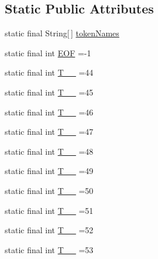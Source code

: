 \subsection*{Static Public Attributes}
\begin{DoxyCompactItemize}
\item 
static final String\mbox{[}$\,$\mbox{]} \hyperlink{classorg_1_1tzi_1_1use_1_1parser_1_1testsuite_1_1_test_suite_parser_ab3d9173889a1ea426141b291af2227ce}{token\-Names}
\item 
static final int \hyperlink{classorg_1_1tzi_1_1use_1_1parser_1_1testsuite_1_1_test_suite_parser_a0ebcee9b6b22f1c9c8759e4a3c16f836}{E\-O\-F} =-\/1
\item 
static final int \hyperlink{classorg_1_1tzi_1_1use_1_1parser_1_1testsuite_1_1_test_suite_parser_a46f9c9c87de4c840f5c45f4f92a27a65}{T\-\_\-\-\_} =44
\item 
static final int \hyperlink{classorg_1_1tzi_1_1use_1_1parser_1_1testsuite_1_1_test_suite_parser_adafd571624b826beb2972b999d5de3e8}{T\-\_\-\-\_} =45
\item 
static final int \hyperlink{classorg_1_1tzi_1_1use_1_1parser_1_1testsuite_1_1_test_suite_parser_a6fb7f06426ecf2205e40e842a1a3cb08}{T\-\_\-\-\_} =46
\item 
static final int \hyperlink{classorg_1_1tzi_1_1use_1_1parser_1_1testsuite_1_1_test_suite_parser_ab83b77dcf05eb35842d0f34f1055af47}{T\-\_\-\-\_} =47
\item 
static final int \hyperlink{classorg_1_1tzi_1_1use_1_1parser_1_1testsuite_1_1_test_suite_parser_aed5433e3db2e62ad12a7c6c7d41721ed}{T\-\_\-\-\_} =48
\item 
static final int \hyperlink{classorg_1_1tzi_1_1use_1_1parser_1_1testsuite_1_1_test_suite_parser_a3cbaeef0361cb06718af841dd29f04f0}{T\-\_\-\-\_} =49
\item 
static final int \hyperlink{classorg_1_1tzi_1_1use_1_1parser_1_1testsuite_1_1_test_suite_parser_a250da1c915306606296293c6b398f37e}{T\-\_\-\-\_} =50
\item 
static final int \hyperlink{classorg_1_1tzi_1_1use_1_1parser_1_1testsuite_1_1_test_suite_parser_a689feacf30dab824b630c86863883729}{T\-\_\-\-\_} =51
\item 
static final int \hyperlink{classorg_1_1tzi_1_1use_1_1parser_1_1testsuite_1_1_test_suite_parser_a51a03aa07c202e0de9cfb4d183e3126a}{T\-\_\-\-\_} =52
\item 
static final int \hyperlink{classorg_1_1tzi_1_1use_1_1parser_1_1testsuite_1_1_test_suite_parser_a8d523a1d73329ff030f62184fb8c1741}{T\-\_\-\-\_} =53

\end{DoxyCompactItemize}

